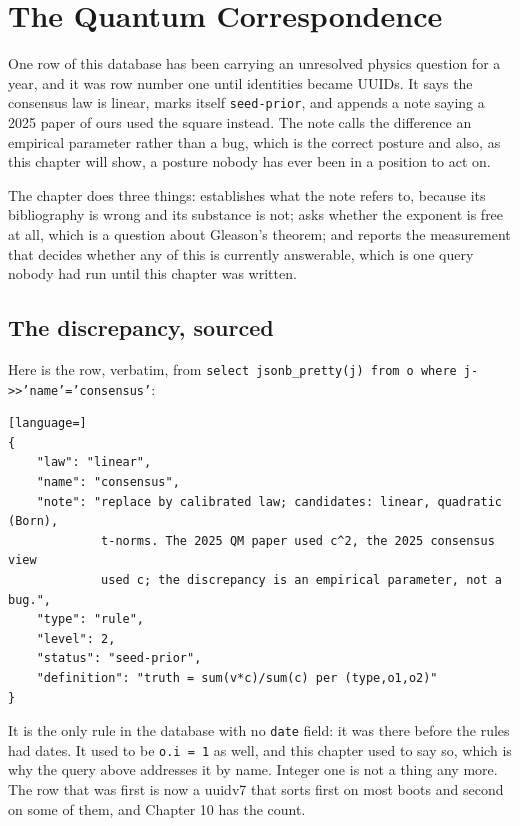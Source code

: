 \chapter{The Quantum Correspondence}

One row of this database has been carrying an unresolved physics question for a year, and it was row number one until identities became UUIDs. It says the consensus law is linear, marks itself \texttt{seed-prior}, and appends a note saying a 2025 paper of ours used the square instead. The note calls the difference an empirical parameter rather than a bug, which is the correct posture and also, as this chapter will show, a posture nobody has ever been in a position to act on.

The chapter does three things: establishes what the note refers to, because its bibliography is wrong and its substance is not; asks whether the exponent is free at all, which is a question about Gleason's theorem; and reports the measurement that decides whether any of this is currently answerable, which is one query nobody had run until this chapter was written.

\section{The discrepancy, sourced}

Here is the row, verbatim, from \texttt{select jsonb\_pretty(j) from o where j->>'name'='consensus'}:

\begin{lstlisting}[language=]
{
    "law": "linear",
    "name": "consensus",
    "note": "replace by calibrated law; candidates: linear, quadratic (Born),
             t-norms. The 2025 QM paper used c^2, the 2025 consensus view
             used c; the discrepancy is an empirical parameter, not a bug.",
    "type": "rule",
    "level": 2,
    "status": "seed-prior",
    "definition": "truth = sum(v*c)/sum(c) per (type,o1,o2)"
}
\end{lstlisting}

It is the only rule in the database with no \texttt{date} field: it was there before the rules had dates. It used to be \texttt{o.i = 1} as well, and this chapter used to say so, which is why the query above addresses it by name. Integer one is not a thing any more. The row that was first is now a uuidv7 that sorts first on most boots and second on some of them, and Chapter 10 has the count.

